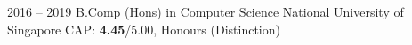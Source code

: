 \documentclass[9pt]{developercv} %
\begin{document}


\begin{entrylist}
	\entry
		{2016 -- 2019}
		{B.Comp (Hons) in Computer Science}
		{National University of Singapore}
		{CAP: \textbf{4.45}/5.00, Honours (Distinction)}
\end{entrylist}


	
	
	
	
	

\end{document}
